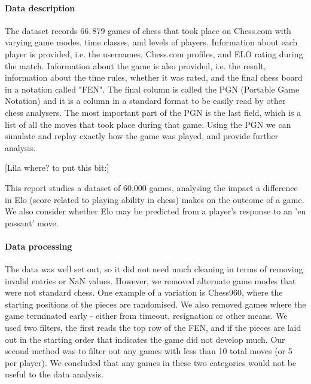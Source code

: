 \documentclass[10pt,a4paper]{article}
\begin{document}
\begin{multicols}{2}
\paragraph{Data description}
The dataset records $66,879$ games of chess that took place on Chess.com with varying game modes, time classes, and levels of players. Information about each player is provided, i.e. the usernames, Chess.com profiles, and ELO rating during the match. Information about the game is also provided, i.e. the result, information about the time rules, whether it was rated, and the final chess board in a notation called "FEN". The final column is called the PGN (Portable Game Notation) and it is a column in a standard format to be easily read by other chess analysers. The most important part of the PGN is the last field, which is a list of all the moves that took place during that game. Using the PGN we can simulate and replay exactly how the game was played, and provide further analysis.

[Lila where? to put this bit:]

This report studies a dataset of 60,000 games, analysing the impact a difference in Elo (score related to playing ability in chess) makes on the outcome of a game. We also consider whether Elo may be predicted from a player's response to an 'en passant' move.

\paragraph{Data processing}
The data was well set out, so it did not need much cleaning in terms of removing invalid entries or NaN values. However, we removed alternate game modes that were not standard chess. One example of a variation is Chess960, where the starting positions of the pieces are randomised.
We also removed games where the game terminated early - either from timeout, resignation or other means. We used two filters, the first reads the top row of the FEN, and if the pieces are laid out in the starting order that indicates the game did not develop much. Our second method was to filter out any games with less than 10 total moves (or 5 per player). We concluded that any games in these two categories would not be useful to the data analysis.


\end{multicols}
\end{document}
